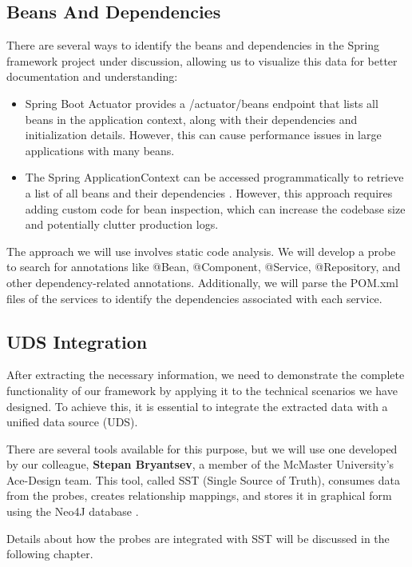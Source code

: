 \subsection{Beans And Dependencies}

There are several ways to identify the beans and dependencies in the Spring framework project under discussion, allowing us to visualize this data for better documentation and understanding:

\begin{itemize}
    \item Spring Boot Actuator provides a /actuator/beans endpoint that lists all beans in the application context, along with their dependencies and initialization details. However, this can cause performance issues in large applications with many beans.
    \item The Spring ApplicationContext can be accessed programmatically to retrieve a list of all beans and their dependencies \citep{baeldung_applicationcontext}. However, this approach requires adding custom code for bean inspection, which can increase the codebase size and potentially clutter production logs.
\end{itemize}

The approach we will use involves static code analysis. We will develop a probe to search for annotations like @Bean, @Component, @Service, @Repository, and other dependency-related annotations. Additionally, we will parse the POM.xml files of the services to identify the dependencies associated with each service.

\subsection{UDS Integration}

After extracting the necessary information, we need to demonstrate the complete functionality of our framework by applying it to the technical scenarios we have designed. To achieve this, it is essential to integrate the extracted data with a unified data source (UDS).

There are several tools available for this purpose, but we will use one developed by our colleague, \textbf{Stepan Bryantsev}, a member of the McMaster University's Ace-Design team. This tool, called SST (Single Source of Truth), consumes data from the probes, creates relationship mappings, and stores it in graphical form using the Neo4J database \citep{neo4j}.

Details about how the probes are integrated with SST will be discussed in the following chapter.

